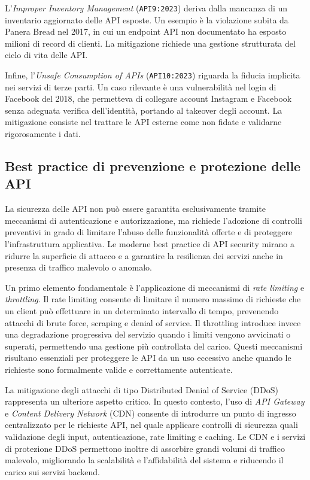 L’\emph{Improper Inventory Management} (\texttt{API9:2023}) deriva dalla mancanza di un inventario aggiornato delle API esposte. Un esempio è la violazione subita da Panera Bread nel 2017, in cui un endpoint API non documentato ha esposto milioni di record di clienti. La mitigazione richiede una gestione strutturata del ciclo di vita delle API.

Infine, l’\emph{Unsafe Consumption of APIs} (\texttt{API10:2023}) riguarda la fiducia implicita nei servizi di terze parti. Un caso rilevante è una vulnerabilità nel login di Facebook del 2018, che permetteva di collegare account Instagram e Facebook senza adeguata verifica dell’identità, portando al takeover degli account. La mitigazione consiste nel trattare le API esterne come non fidate e validarne rigorosamente i dati.

\subsection{Best practice di prevenzione e protezione delle API}

La sicurezza delle API non può essere garantita esclusivamente tramite meccanismi di autenticazione e autorizzazione, ma richiede l’adozione di controlli preventivi in grado di limitare l’abuso delle funzionalità offerte e di proteggere l’infrastruttura applicativa. Le moderne best practice di API security mirano a ridurre la superficie di attacco e a garantire la resilienza dei servizi anche in presenza di traffico malevolo o anomalo.

Un primo elemento fondamentale è l’applicazione di meccanismi di \emph{rate limiting} e \emph{throttling}. Il rate limiting consente di limitare il numero massimo di richieste che un client può effettuare in un determinato intervallo di tempo, prevenendo attacchi di brute force, scraping e denial of service. Il throttling introduce invece una degradazione progressiva del servizio quando i limiti vengono avvicinati o superati, permettendo una gestione più controllata del carico. Questi meccanismi risultano essenziali per proteggere le API da un uso eccessivo anche quando le richieste sono formalmente valide e correttamente autenticate.

La mitigazione degli attacchi di tipo Distributed Denial of Service (DDoS) rappresenta un ulteriore aspetto critico. In questo contesto, l’uso di \emph{API Gateway} e \emph{Content Delivery Network} (CDN) consente di introdurre un punto di ingresso centralizzato per le richieste API, nel quale applicare controlli di sicurezza quali validazione degli input, autenticazione, rate limiting e caching. Le CDN e i servizi di protezione DDoS permettono inoltre di assorbire grandi volumi di traffico malevolo, migliorando la scalabilità e l’affidabilità del sistema e riducendo il carico sui servizi backend.

